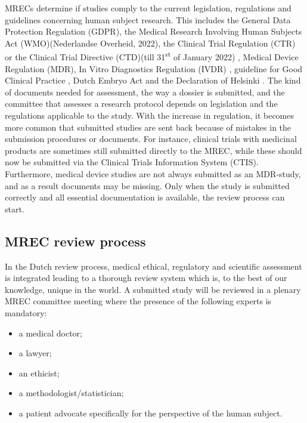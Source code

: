 \documentclass[authordate, empirical]{jote-new-article}
\begin{document}
	MRECs determine if studies comply to the current legislation, regulations and guidelines concerning human subject research. This includes the General Data Protection Regulation (GDPR)\parencites{TheEuropeanParliament2016}, the Medical Research Involving Human Subjects Act (WMO)(Nederlandse Overheid, 2022), the Clinical Trial Regulation (CTR) \parencites{TheEuropeanParliament2014} or the Clinical Trial Directive (CTD)(till 31\textsuperscript{st} of January 2022)  \parencites{TheEuropeanParliament2001}, Medical Device Regulation (MDR)\parencites{TheEuropeanParliament2021}, In Vitro Diagnostics Regulation (IVDR) \parencites{TheEuropeanParliament2017}, guideline for Good Clinical Practice \parencites{EuropeanMedicinesAgency2016}, Dutch Embryo Act \parencites{NederlandseOverheid2021} and the Declaration of Helsinki \parencites{TheWorldMedicalAssociation2013}. The kind of documents needed for assessment, the way a dossier is submitted, and the committee that assesses a research protocol depends on legislation and the regulations applicable to the study. With the increase in regulation, it becomes more common that submitted studies are sent back because of mistakes in the submission procedures or documents. For instance, clinical trials with medicinal products are sometimes still submitted directly to the MREC, while these should now be submitted via the Clinical Trials Information System (CTIS). Furthermore, medical device studies are not always submitted as an MDR-study, and as a result documents may be missing. Only when the study is submitted correctly and all essential documentation is available, the review process can start.







	\subsection{MREC review process}



	In the Dutch review process, medical ethical, regulatory and scientific assessment is integrated leading to a thorough review system which is, to the best of our knowledge, unique in the world. A submitted study will be reviewed in a plenary MREC committee meeting where the presence of the following experts is mandatory:

	\begin{itemize}
		\item a medical doctor;



		\item a lawyer;



		\item an ethicist;



		\item a methodologist/statistician; 



		\item a patient advocate specifically for the perspective of the human subject.


	\end{itemize}
\end{document}
